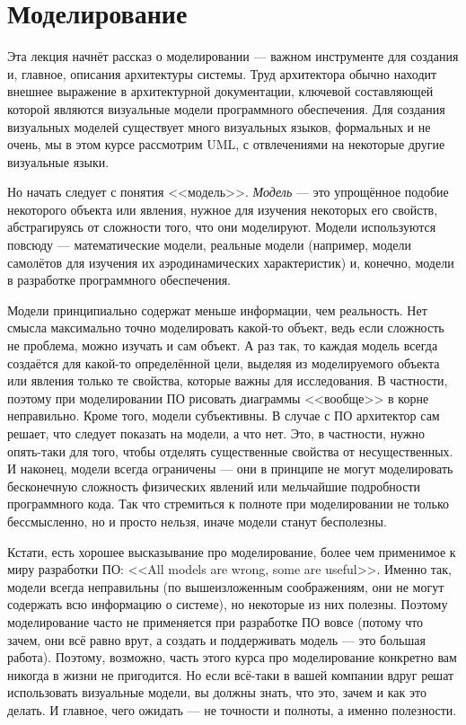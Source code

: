 \documentclass{../text-style}
\begin{document}
\maketitle
\thispagestyle{empty}

\section{Моделирование}

Эта лекция начнёт рассказ о моделировании --- важном инструменте для создания и, главное, описания архитектуры системы. Труд архитектора обычно находит внешнее выражение в архитектурной документации, ключевой составляющей которой являются визуальные модели программного обеспечения. Для создания визуальных моделей существует много визуальных языков, формальных и не очень, мы в этом курсе рассмотрим UML, с отвлечениями на некоторые другие визуальные языки.

Но начать следует с понятия <<модель>>. \textit{Модель} --- это упрощённое подобие некоторого объекта или явления, нужное для изучения некоторых его свойств, абстрагируясь от сложности того, что они моделируют. Модели используются повсюду --- математические модели, реальные модели (например, модели самолётов для изучения их аэродинамических характеристик) и, конечно, модели в разработке программного обеспечения.

Модели принципиально содержат меньше информации, чем реальность. Нет смысла максимально точно моделировать какой-то объект, ведь если сложность не проблема, можно изучать и сам объект. А раз так, то каждая модель всегда создаётся для какой-то определённой цели, выделяя из моделируемого объекта или явления только те свойства, которые важны для исследования. В частности, поэтому при моделировании ПО рисовать диаграммы <<вообще>> в корне неправильно. Кроме того, модели субъективны. В случае с ПО архитектор сам решает, что следует показать на модели, а что нет. Это, в частности, нужно опять-таки для того, чтобы отделять существенные свойства от несущественных. И наконец, модели всегда ограничены --- они в принципе не могут моделировать бесконечную сложность физических явлений или мельчайшие подробности программного кода. Так что стремиться к полноте при моделировании не только бессмысленно, но и просто нельзя, иначе модели станут бесполезны.

Кстати, есть хорошее высказывание про моделирование, более чем применимое к миру разработки ПО: <<All models are wrong, some are useful>>. Именно так, модели всегда неправильны (по вышеизложенным соображениям, они не могут содержать всю информацию о системе), но некоторые из них полезны. Поэтому моделирование часто не применяется при разработке ПО вовсе (потому что зачем, они всё равно врут, а создать и поддерживать модель --- это большая работа). Поэтому, возможно, часть этого курса про моделирование конкретно вам никогда в жизни не пригодится. Но если всё-таки в вашей компании вдруг решат использовать визуальные модели, вы должны знать, что это, зачем и как это делать. И главное, чего ожидать --- не точности и полноты, а именно полезности.
\end{document}

